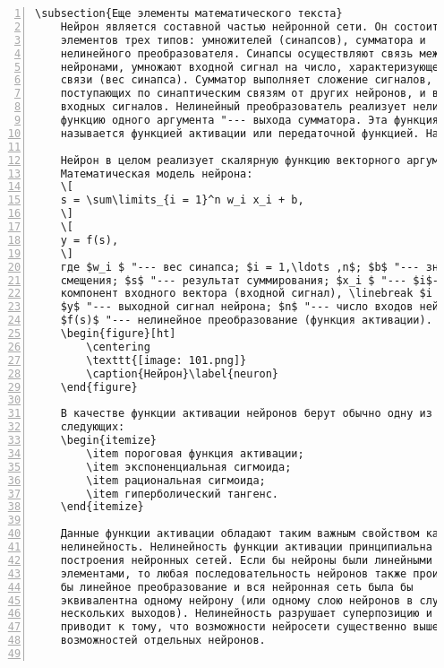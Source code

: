 \documentclass[bachelor, och, pract]{SCWorks}
\begin{document}
\begin{Verbatim}[fontsize=\small, numbers=left]
	\subsection{Еще элементы математического текста}
	Нейрон является составной частью нейронной сети. Он состоит из
	элементов трех типов: умножителей (синапсов), сумматора и
	нелинейного преобразователя. Синапсы осуществляют связь между
	нейронами, умножают входной сигнал на число, характеризующее силу
	связи (вес синапса). Сумматор выполняет сложение сигналов,
	поступающих по синаптическим связям от других нейронов, и внешних
	входных сигналов. Нелинейный преобразователь реализует нелинейную
	функцию одного аргумента "--- выхода сумматора. Эта функция
	называется функцией активации или передаточной функцией. На рисунке~\ref{neuron} приведено строение одного нейрона.
	
	Нейрон в целом реализует скалярную функцию векторного аргумента.
	Математическая модель нейрона:
	\[
	s = \sum\limits_{i = 1}^n w_i x_i + b,
	\]
	\[
	y = f(s),
	\]
	где $w_i $ "--- вес синапса; $i = 1,\ldots ,n$; $b$ "--- значение
	смещения; $s$ "--- результат суммирования; $x_i $ "--- $i$-тый
	компонент входного вектора (входной сигнал), \linebreak $i = 1,\ldots, n$;
	$y$ "--- выходной сигнал нейрона; $n$ "--- число входов нейрона;
	$f(s)$ "--- нелинейное преобразование (функция активации).
	\begin{figure}[ht]
		\centering
		\texttt{[image: 101.png]}
		\caption{Нейрон}\label{neuron}
	\end{figure}
	
	В качестве функции активации нейронов берут обычно одну из
	следующих:
	\begin{itemize}
		\item пороговая функция активации;
		\item экспоненциальная сигмоида;
		\item рациональная сигмоида;
		\item гиперболический тангенс.
	\end{itemize}
	
	Данные функции активации обладают таким важным свойством как
	нелинейность. Нелинейность функции активации принципиальна для
	построения нейронных сетей. Если бы нейроны были линейными
	элементами, то любая последовательность нейронов также производила
	бы линейное преобразование и вся нейронная сеть была бы
	эквивалентна одному нейрону (или одному слою нейронов в случае
	нескольких выходов). Нелинейность разрушает суперпозицию и
	приводит к тому, что возможности нейросети существенно выше
	возможностей отдельных нейронов.
	

\end{Verbatim}
\end{document}
